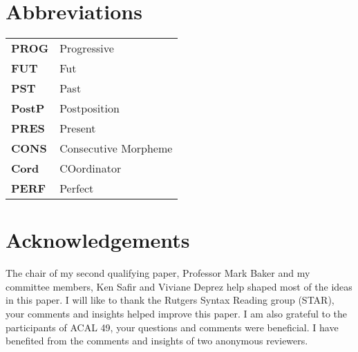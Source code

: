 \documentclass[output=paper,
modfonts
]{langscibook}
\begin{document}
\section*{Abbreviations}


\begin{tabular}{l l} 
\textbf{PROG} & Progressive \\
\textbf{FUT} & Fut \\
\textbf{PST} & Past \\
\textbf{PostP} & Postposition  \\
\textbf{PRES} & Present  \\
\textbf{CONS} & Consecutive Morpheme  \\
\textbf{Cord} & COordinator \\

\textbf{PERF} & Perfect \\

\end{tabular}





\section*{Acknowledgements}
The chair of my second qualifying paper, Professor Mark Baker and my committee members, Ken Safir and Viviane Deprez help shaped most of the ideas in this paper. I will like to thank the Rutgers Syntax Reading group (STAR), your comments and insights helped improve this paper. I am also grateful to the participants of ACAL 49, your questions and comments were beneficial. I have benefited from the comments and insights of two anonymous reviewers.






\printbibliography[heading=subbibliography,notkeyword=this]
\end{document}
